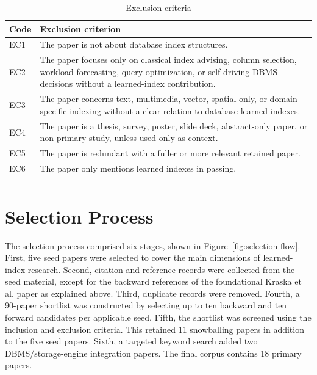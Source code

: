 \documentclass[a4paper, 12pt, twoside]{report}
\begin{document}
\begin{longtable}{|p{1.4cm}|p{12cm}|}
\hline
\textbf{Code} & \textbf{Exclusion criterion} \\
\hline
EC1 & The paper is not about database index structures. \\
\hline
EC2 & The paper focuses only on classical index advising, column selection, workload forecasting, query optimization, or self-driving DBMS decisions without a learned-index contribution. \\
\hline
EC3 & The paper concerns text, multimedia, vector, spatial-only, or domain-specific indexing without a clear relation to database learned indexes. \\
\hline
EC4 & The paper is a thesis, survey, poster, slide deck, abstract-only paper, or non-primary study, unless used only as context. \\
\hline
EC5 & The paper is redundant with a fuller or more relevant retained paper. \\
\hline
EC6 & The paper only mentions learned indexes in passing. \\
\hline
\caption{Exclusion criteria}
\label{tab:exclusion-criteria}
\end{longtable}

\section{Selection Process}

The selection process comprised six stages, shown in Figure~\ref{fig:selection-flow}. First, five seed papers were selected to cover the main dimensions of learned-index research. Second, citation and reference records were collected from the seed material, except for the backward references of the foundational Kraska et al. paper as explained above. Third, duplicate records were removed. Fourth, a 90-paper shortlist was constructed by selecting up to ten backward and ten forward candidates per applicable seed. Fifth, the shortlist was screened using the inclusion and exclusion criteria. This retained 11 snowballing papers in addition to the five seed papers. Sixth, a targeted keyword search added two DBMS/storage-engine integration papers. The final corpus contains 18 primary papers.
\end{document}
